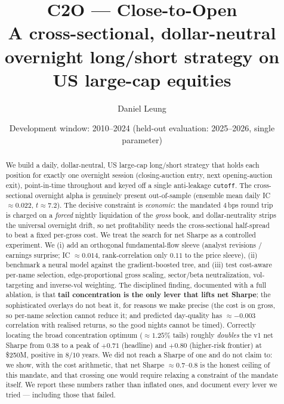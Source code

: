 \documentclass[11pt,a4paper]{article}
\title{\textbf{C2O --- Close-to-Open}\\[2pt]
\large A cross-sectional, dollar-neutral overnight long/short strategy on US large-cap equities}
\author{Daniel Leung}
\date{Development window: 2010--2024 \quad(held-out evaluation: 2025--2026, single \code{cutoff} parameter)}
\makeatletter
\newcommand{\code}[1]{\texttt{#1}}
\newcommand{\icEns}{0.022}
\newcommand{\icEnsT}{7.2}
\newcommand{\icFlow}{0.014}
\newcommand{\sleeveCorr}{0.11}
\newcommand{\netVone}{0.38}                  %
\newcommand{\headBench}{0.71}                %
\newcommand{\headPosYears}{8/10}
\newcommand{\frontBench}{0.80}             %
\newcommand{\edgeCorr}{-0.003}            %
\makeatother
\begin{document}
\maketitle

\begin{abstract}
\noindent We build a daily, dollar-neutral, US large-cap long/short strategy that holds each position for
exactly one overnight session (closing-auction entry, next opening-auction exit), point-in-time throughout
and keyed off a single anti-leakage \code{cutoff}. The cross-sectional overnight alpha is genuinely present
out-of-sample (ensemble mean daily IC $\approx\icEns$, $t\approx\icEnsT$). The decisive constraint is
\emph{economic}: the mandated $4$\,bps round trip is charged on a \emph{forced} nightly liquidation of the
\emph{gross} book, and dollar-neutrality strips the universal overnight drift, so net profitability needs the
cross-sectional half-spread to beat a fixed per-gross cost. We treat the search for net Sharpe as a controlled
experiment. We (i) add an orthogonal fundamental-flow sleeve (analyst revisions / earnings surprise; IC
$\approx\icFlow$, rank-correlation only $\sleeveCorr$ to the price sleeve), (ii) benchmark a neural model
against the gradient-boosted tree, and (iii) test cost-aware per-name selection, edge-proportional gross
scaling, sector/beta neutralization, vol-targeting and inverse-vol weighting. The disciplined finding,
documented with a full ablation, is that \textbf{tail concentration is the only lever that lifts net Sharpe};
the sophisticated overlays do not beat it, for reasons we make precise (the cost is on gross, so per-name
selection cannot reduce it; and predicted day-quality has $\approx\edgeCorr$ correlation with realised
returns, so the good nights cannot be timed). Correctly locating the broad concentration optimum
($\approx1.25\%$ tails) roughly \emph{doubles} the v1 net Sharpe from $\netVone$ to a peak of $+\headBench$
(headline) and $+\frontBench$ (higher-risk frontier) at \$250M, positive in $\headPosYears$ years. We did not
reach a Sharpe of one and do not claim to: we show, with the cost arithmetic, that net Sharpe $\approx0.7$--$0.8$
is the honest ceiling of this mandate, and that crossing one would require relaxing a constraint of the mandate
itself. We report these numbers rather than inflated ones, and document every lever we tried --- including those
that failed.
\end{abstract}
\end{document}
